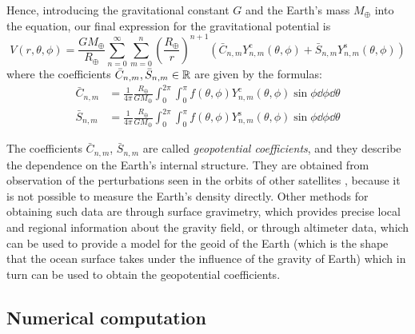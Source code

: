 \documentclass[../main.tex]{subfiles}
\begin{document}
Hence, introducing the gravitational constant $G$ and the Earth's mass $M_\oplus$ into the equation, our final expression for the gravitational potential is
\begin{equation}\label{eq:Potential}
  V(r,\theta,\phi) =\frac{GM_\oplus}{R_\oplus}\sum_{n=0}^\infty \sum_{m=0}^n{\left(\frac{{R_\oplus}}{r}\right)}^{n+1}(\bar{C}_{n,m}Y_{n,m}^{\mathrm{c}}(\theta,\phi)+\bar{S}_{n,m}Y_{n,m}^{\mathrm{s}}(\theta,\phi))
\end{equation}
where the coefficients $\bar{C}_{n,m},\bar{S}_{n,m}\in\mathbb{R}$ are given by the formulas:
\begin{align}
  \bar{C}_{n,m} & =\frac{1}{4\pi}\frac{R_\oplus}{G M_\oplus}\int_0^{2\pi}\int_0^\pi f(\theta,\phi)  Y_{n,m}^\mathrm{c}(\theta,\phi)\sin\phi\dd{\phi}\dd{\theta} \\
  \bar{S}_{n,m} & =\frac{1}{4\pi}\frac{R_\oplus}{G M_\oplus}\int_0^{2\pi}\int_0^\pi f(\theta,\phi)  Y_{n,m}^\mathrm{s}(\theta,\phi)\sin\phi\dd{\phi}\dd{\theta}
\end{align}

The coefficients $\bar{C}_{n,m}$, $\bar{S}_{n,m}$ are called \emph{geopotential coefficients}, and they describe the dependence on the Earth's internal structure. They are obtained from observation of the perturbations seen in the orbits of other satellites \cite{montenbruck}, because it is not possible to measure the Earth's density directly. Other methods for obtaining such data are through surface gravimetry, which provides precise local and regional information about the gravity field, or through altimeter data, which can be used to provide a model for the geoid of the Earth (which is the shape that the ocean surface takes under the influence of the gravity of Earth) which in turn can be used to obtain the geopotential coefficients.
\subsection{Numerical computation}
\end{document}
